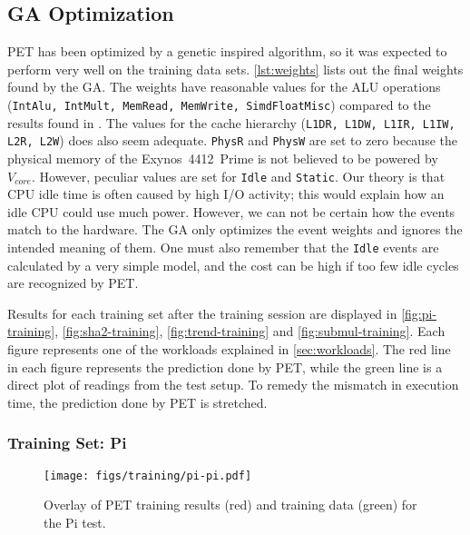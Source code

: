 \subsection{GA Optimization}

PET has been optimized by a genetic inspired algorithm, so it was expected to
perform very well on the training data sets. \autoref{lst:weights} lists out the
final weights found by the GA. The weights have reasonable values for the ALU
operations (\texttt{IntAlu, IntMult, MemRead, MemWrite, SimdFloatMisc}) compared
to the results found in \cite{rundehvatum2013exploring}. The values for the
cache hierarchy (\texttt{L1DR, L1DW, L1IR, L1IW, L2R, L2W}) does also seem
adequate. \texttt{PhysR} and \texttt{PhysW} are set to zero because the physical
memory of the Exynos~4412~Prime is not believed to be powered by $V_{core}$.
However, peculiar values are set for \texttt{Idle} and \texttt{Static}. Our
theory is that CPU idle time is often caused by high I/O activity; this would
explain how an idle CPU could use much power. However, we can not be certain how
the events match to the hardware. The GA only optimizes the event weights and
ignores the intended meaning of them. One must also remember that the
\texttt{Idle} events are calculated by a very simple model, and the cost can
be high if too few idle cycles are recognized by PET.



Results for each training set after the training session are displayed in
\autoref{fig:pi-training}, \autoref{fig:sha2-training},
\autoref{fig:trend-training} and \autoref{fig:submul-training}. Each figure
represents one of the workloads explained in \autoref{sec:workloads}. The red
line in each figure represents the prediction done by PET, while the green line
is a direct plot of readings from the test setup. To remedy the mismatch in
execution time, the prediction done by PET is stretched.


\newpage

\subsubsection{Training Set: Pi}
\begin{figure}[htb]
    \centering
    \texttt{[image: figs/training/pi-pi.pdf]}
    \caption{Overlay of PET training results (red) and training data (green) for the Pi test.}
    \label{fig:pi-training}
\end{figure}

